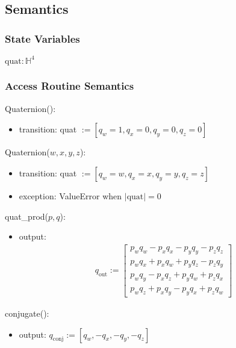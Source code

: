 \documentclass[12pt, titlepage]{article}
\begin{document}
\subsection{Semantics}

\subsubsection{State Variables}

$\text{quat}: \mathbb{H}^4$

\subsubsection{Access Routine Semantics}

\noindent Quaternion():
\begin{itemize}
\item transition: quat $:=[q_w = 1, q_x = 0, q_y = 0, q_z = 0]$
\end{itemize}

\noindent Quaternion($w, x, y, z$):
\begin{itemize}
\item transition: quat $:=[q_w = w, q_x = x, q_y = y, q_z = z]$
\item exception: ValueError when $|\text{quat}| = 0$
\end{itemize}

\noindent quat\_prod($p, q$):
\begin{itemize}
\item output:
  \begin{align*}
    q_\text{out} :=  \begin{bmatrix}
      p_w q_w - p_x q_x - p_y q_y - p_z q_z \\
      p_w q_x + p_x q_w + p_y q_z - p_z q_y \\
      p_w q_y - p_x q_z + p_y q_w + p_z q_x \\
      p_w q_z + p_x q_y - p_y q_x + p_z q_w
  \end{bmatrix}
  \end{align*}
\end{itemize}

\noindent conjugate():
\begin{itemize}
\item output: $q_\text{conj} :=  [q_w, -q_x, -q_y, -q_z]$
\end{itemize}
\end{document}
